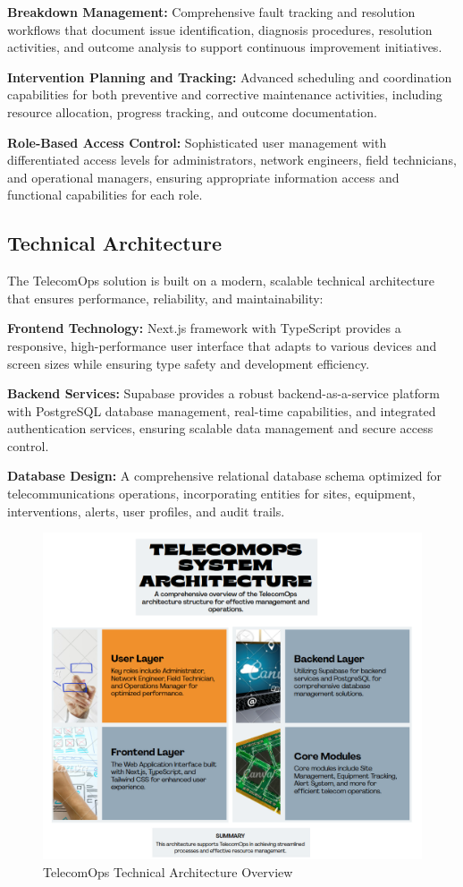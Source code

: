 \textbf{Breakdown Management:} Comprehensive fault tracking and resolution workflows that document issue identification, diagnosis procedures, resolution activities, and outcome analysis to support continuous improvement initiatives.

\textbf{Intervention Planning and Tracking:} Advanced scheduling and coordination capabilities for both preventive and corrective maintenance activities, including resource allocation, progress tracking, and outcome documentation.

\textbf{Role-Based Access Control:} Sophisticated user management with differentiated access levels for administrators, network engineers, field technicians, and operational managers, ensuring appropriate information access and functional capabilities for each role.

\subsection{Technical Architecture}

The TelecomOps solution is built on a modern, scalable technical architecture that ensures performance, reliability, and maintainability:

\textbf{Frontend Technology:} Next.js framework with TypeScript provides a responsive, high-performance user interface that adapts to various devices and screen sizes while ensuring type safety and development efficiency.

\textbf{Backend Services:} Supabase provides a robust backend-as-a-service platform with PostgreSQL database management, real-time capabilities, and integrated authentication services, ensuring scalable data management and secure access control.

\textbf{Database Design:} A comprehensive relational database schema optimized for telecommunications operations, incorporating entities for sites, equipment, interventions, alerts, user profiles, and audit trails.

\begin{figure}[H]
    \centering
    \includegraphics[width=0.9\columnwidth]{img/TELECOMOPS SYSTEM ARCHITECTURE.png}
    \caption{TelecomOps Technical Architecture Overview}
    \label{fig:architecture}
\end{figure}


